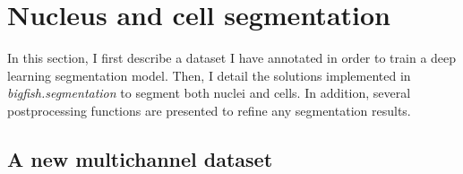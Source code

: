 

\section{Nucleus and cell segmentation}
\label{sec:segmentation_nuc_cell}

In this section, I first describe a dataset I have annotated in order to train a deep learning segmentation model.
Then, I detail the solutions implemented in \emph{bigfish.segmentation} to segment both nuclei and cells.
In addition, several postprocessing functions are presented to refine any segmentation results.

\subsection{A new multichannel dataset}
\label{subsec:segmentation_data}

